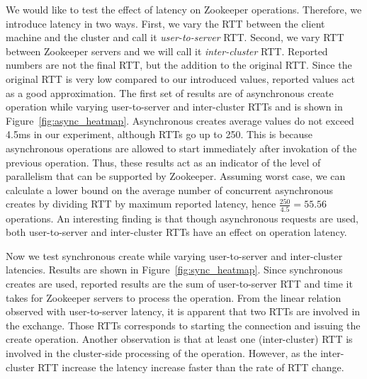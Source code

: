 We would like to test the effect of latency on Zookeeper operations. Therefore, we introduce latency in two ways. First, we vary the RTT between the client machine and the cluster and call it \emph{user-to-server} RTT. Second, we vary RTT between Zookeeper servers and we will call it \emph{inter-cluster} RTT. Reported numbers are not the final RTT, but the addition to the original RTT. Since the original RTT is very low compared to our introduced values, reported values act as a good approximation. The first set of results are of asynchronous create operation while varying user-to-server and inter-cluster RTTs and is shown in Figure~\ref{fig:async_heatmap}. Asynchronous creates average values do not exceed 4.5ms in our experiment, although RTTs go up to 250. This is because asynchronous operations are allowed to start immediately after invokation of the previous operation. Thus, these results act as an indicator of the level of parallelism that can be supported by Zookeeper. Assuming worst case, we can calculate a lower bound on the average number of concurrent asynchronous creates by dividing RTT by maximum reported latency, hence $\frac{250}{4.5} = 55.56$ operations. An interesting finding is that though asynchronous requests are used, both user-to-server and inter-cluster RTTs have an effect on operation latency.

Now we test synchronous create while varying user-to-server and inter-cluster latencies. Results are shown in Figure~\ref{fig:sync_heatmap}. Since synchronous creates are used, reported results are the sum of user-to-server RTT and time it takes for Zookeeper servers to process the operation. From the linear relation observed with user-to-server latency, it is apparent that two RTTs are involved in the exchange. Those RTTs corresponds to starting the connection and issuing the create operation. Another observation is that at least one (inter-cluster) RTT is involved in the cluster-side processing of the operation. However, as the inter-cluster RTT increase the latency increase faster than the rate of RTT change. 

